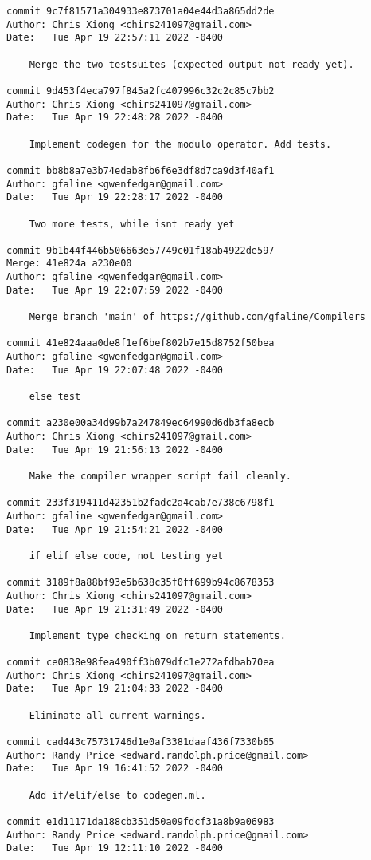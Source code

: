 {\begin{verbatim}
commit 9c7f81571a304933e873701a04e44d3a865dd2de
Author: Chris Xiong <chirs241097@gmail.com>
Date:   Tue Apr 19 22:57:11 2022 -0400

    Merge the two testsuites (expected output not ready yet).

commit 9d453f4eca797f845a2fc407996c32c2c85c7bb2
Author: Chris Xiong <chirs241097@gmail.com>
Date:   Tue Apr 19 22:48:28 2022 -0400

    Implement codegen for the modulo operator. Add tests.

commit bb8b8a7e3b74edab8fb6f6e3df8d7ca9d3f40af1
Author: gfaline <gwenfedgar@gmail.com>
Date:   Tue Apr 19 22:28:17 2022 -0400

    Two more tests, while isnt ready yet

commit 9b1b44f446b506663e57749c01f18ab4922de597
Merge: 41e824a a230e00
Author: gfaline <gwenfedgar@gmail.com>
Date:   Tue Apr 19 22:07:59 2022 -0400

    Merge branch 'main' of https://github.com/gfaline/Compilers

commit 41e824aaa0de8f1ef6bef802b7e15d8752f50bea
Author: gfaline <gwenfedgar@gmail.com>
Date:   Tue Apr 19 22:07:48 2022 -0400

    else test

commit a230e00a34d99b7a247849ec64990d6db3fa8ecb
Author: Chris Xiong <chirs241097@gmail.com>
Date:   Tue Apr 19 21:56:13 2022 -0400

    Make the compiler wrapper script fail cleanly.

commit 233f319411d42351b2fadc2a4cab7e738c6798f1
Author: gfaline <gwenfedgar@gmail.com>
Date:   Tue Apr 19 21:54:21 2022 -0400

    if elif else code, not testing yet

commit 3189f8a88bf93e5b638c35f0ff699b94c8678353
Author: Chris Xiong <chirs241097@gmail.com>
Date:   Tue Apr 19 21:31:49 2022 -0400

    Implement type checking on return statements.

commit ce0838e98fea490ff3b079dfc1e272afdbab70ea
Author: Chris Xiong <chirs241097@gmail.com>
Date:   Tue Apr 19 21:04:33 2022 -0400

    Eliminate all current warnings.

commit cad443c75731746d1e0af3381daaf436f7330b65
Author: Randy Price <edward.randolph.price@gmail.com>
Date:   Tue Apr 19 16:41:52 2022 -0400

    Add if/elif/else to codegen.ml.

commit e1d11171da188cb351d50a09fdcf31a8b9a06983
Author: Randy Price <edward.randolph.price@gmail.com>
Date:   Tue Apr 19 12:11:10 2022 -0400


\end{verbatim}}
